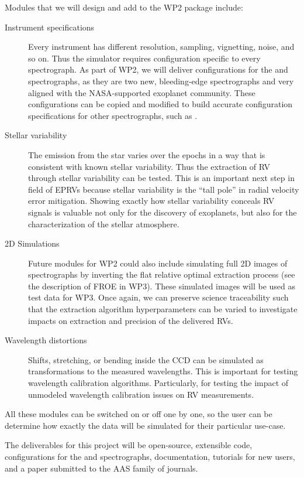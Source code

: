 \documentclass[12pt]{article}
\begin{document}
Modules that we will design and add to the WP2 package include:
\begin{description}
\item[Instrument specifications]
Every instrument has different resolution, sampling, vignetting, noise, and so on. Thus the simulator requires configuration specific to every spectrograph. As part of WP2, we will deliver configurations for the  and  spectrographs, as they are two new, bleeding-edge spectrographs and very aligned with the NASA-supported exoplanet community. These configurations can be copied and modified to build accurate configuration specifications for other spectrographs, such as .
\item[Stellar variability]
The emission from the star varies over the epochs in a way that is consistent with known stellar variability. Thus the extraction of RV through stellar variability can be tested. This is an important next step in field of EPRVs because stellar variability is the ``tall pole'' in radial velocity error mitigation. Showing exactly how stellar variability conceals RV signals is valuable not only for the discovery of exoplanets, but also for the characterization of the stellar atmosphere. 
\item[2D Simulations]
Future modules for WP2 could also include simulating full 2D images of spectrographs by inverting the flat relative optimal extraction process (see the description of FROE in WP3). These simulated images will be used as test data for WP3. Once again, we can preserve science traceability such that the extraction algorithm hyperparameters can be varied to investigate impacts on extraction and precision of the delivered RVs.
\item[Wavelength distortions]
Shifts, stretching, or bending inside the CCD can be simulated as transformations to the measured wavelengths. This is important for testing wavelength calibration algorithms. Particularly, for testing the impact of unmodeled wavelength calibration issues on RV measurements.
\end{description}
All these modules can be switched on or off one by one, so the user can be determine how exactly the data will be simulated for their particular use-case. 

The deliverables for this project will be open-source, extensible code, configurations for the  and  spectrographs, documentation, tutorials for new users, and a paper submitted to the AAS family of journals.
\end{document}
